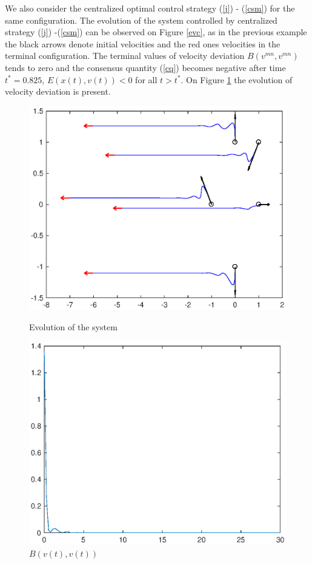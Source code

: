 \documentclass[a4paper,10pt, english]{article}
\begin{document}
We also consider the centralized optimal control strategy (\ref{j}) - (\ref{csm}) for the same configuration. The evolution of the system controlled by centralized strategy (\ref{j}) -(\ref{csm}) can be observed on Figure \ref{evc}, as in the previous example the black arrows denote initial velocities and the red ones velocities in the terminal configuration.  The terminal values 
of velocity deviation $B(v^{mn}, v^{mn})$ tends to zero and the consensus quantity (\ref{cq}) becomes negative after time $t^* = 0.825$,  $E(x(t), v(t)) < 0$ for all $t>t^{*}$. On Figure \ref{lfc} the evolution of velocity deviation is present.
\begin{figure}[ht]
  \begin{minipage}[b]{0.5\textwidth}
    \includegraphics[width=\textwidth]{figures/a5_C_ev.eps}
    \caption{Evolution of the system}
    \label{evc}
  \end{minipage}
  \hfill
  \begin{minipage}[b]{0.5\textwidth}
    \includegraphics[width=\textwidth]{figures/a5_C_lf.eps}
    \caption{$B(v(t), v(t))$ }
    \label{lfc}
  \end{minipage}
\end{figure}
\end{document}
